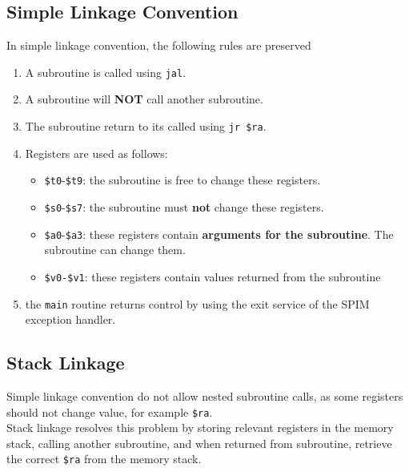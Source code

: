 \documentclass[12pt]{article}
\theoremstyle{definition}
\begin{document}
\subsection{Simple Linkage Convention}
In simple linkage convention, the following rules are preserved
\begin{enumerate}
  \item A subroutine is called using \texttt{jal}.
  \item A subroutine will \textbf{NOT} call another subroutine.
  \item The subroutine return to its called using \texttt{jr \$ra}.
  \item Registers are used as follows:
  \begin{itemize}
    \item \texttt{\$t0}-\texttt{\$t9}: the subroutine is free to change these registers.
    \item \texttt{\$s0}-\texttt{\$s7}: the subroutine must \textbf{not} change these registers.
    \item \texttt{\$a0}-\texttt{\$a3}: these registers contain \textbf{arguments for the subroutine}. The subroutine can change them.
    \item \texttt{\$v0-\$v1}: these registers contain values returned from the subroutine
  \end{itemize}
  \item the \texttt{main} routine returns control by using the exit service of the SPIM exception handler.
\end{enumerate}
\subsection{Stack Linkage}
Simple linkage convention do not allow nested subroutine calls, as some registers should not change value, for example \texttt{\$ra}. \\
Stack linkage resolves this problem by storing relevant registers in the memory stack, calling another subroutine, and when returned from subroutine, retrieve the correct \texttt{\$ra} from the memory stack.
\end{document}
